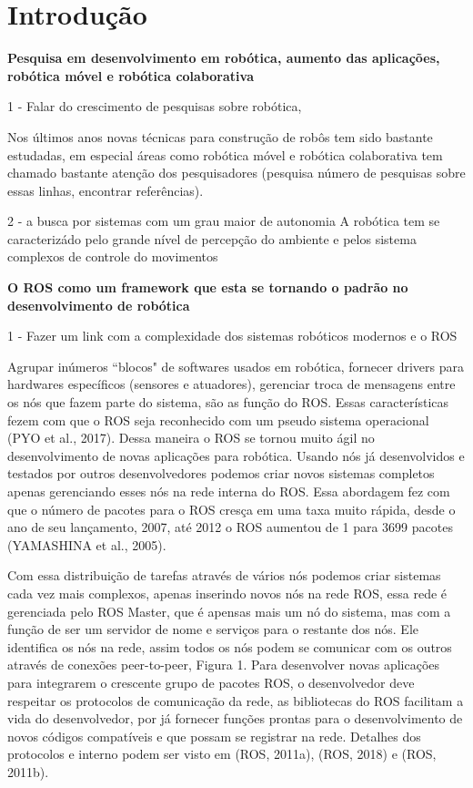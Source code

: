 \chapter{Introdução}

\textbf{Pesquisa em desenvolvimento em robótica, aumento das aplicações, robótica móvel e robótica
colaborativa}

1 - Falar do crescimento de pesquisas sobre robótica, 

Nos últimos anos novas técnicas para construção de robôs tem sido bastante estudadas, em 
especial áreas como robótica móvel e robótica colaborativa tem chamado bastante atenção 
dos pesquisadores (pesquisa número de pesquisas sobre essas linhas, encontrar referências).

2 - a busca por sistemas com um grau maior de autonomia
A robótica tem se caracterizádo pelo grande nível de percepção do ambiente e pelos sistema
complexos de controle do movimentos 


\textbf{O ROS como um framework que esta se tornando o padrão no desenvolvimento de robótica}

1 - Fazer um link com a complexidade dos sistemas robóticos modernos e o ROS

Agrupar inúmeros “blocos" de softwares usados em robótica, fornecer drivers para hardwares
específicos (sensores e atuadores), gerenciar troca de mensagens entre os nós que fazem 
parte do sistema, são as função do ROS. Essas características fezem com que o ROS seja 
reconhecido com um pseudo sistema operacional (PYO et al., 2017). Dessa maneira o ROS se 
tornou muito ágil no desenvolvimento de novas aplicações para robótica. Usando nós já 
desenvolvidos e testados por outros desenvolvedores podemos criar novos sistemas 
completos apenas gerenciando esses nós na rede interna do ROS. Essa abordagem fez com 
que o número de pacotes para o ROS cresça em uma taxa muito rápida, desde o ano de seu 
lançamento, 2007, até 2012 o ROS aumentou de 1 para 3699 pacotes (YAMASHINA et al., 2005).

Com essa distribuição de tarefas através de vários nós podemos criar sistemas cada
vez mais complexos, apenas inserindo novos nós na rede ROS, essa rede é gerenciada
pelo ROS Master, que é apensas mais um nó do sistema, mas com a função de ser um
servidor de nome e serviços para o restante dos nós. Ele identifica os nós na rede, assim
todos os nós podem se comunicar com os outros através de conexões peer-to-peer, Figura
1. Para desenvolver novas aplicações para integrarem o crescente grupo de pacotes ROS, o
desenvolvedor deve respeitar os protocolos de comunicação da rede, as bibliotecas do ROS
facilitam a vida do desenvolvedor, por já fornecer funções prontas para o desenvolvimento
de novos códigos compatíveis e que possam se registrar na rede. Detalhes dos protocolos e
interno podem ser visto em (ROS, 2011a), (ROS, 2018) e (ROS, 2011b).

